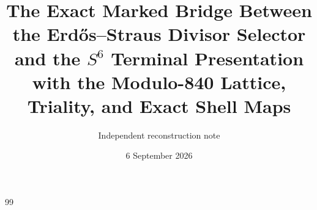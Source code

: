 \documentclass[11pt]{article}
\title{The Exact Marked Bridge Between the Erd\H{o}s--Straus Divisor Selector\\
and the \texorpdfstring{\(S^6\)}{S6} Terminal Presentation\\
with the Modulo-840 Lattice, Triality, and Exact Shell Maps}
\author{Independent reconstruction note}
\date{6 September 2026}
\theoremstyle{definition}
\theoremstyle{remark}
\begin{document}
\maketitle



\begin{thebibliography}{99}

\end{thebibliography}
\end{document}
